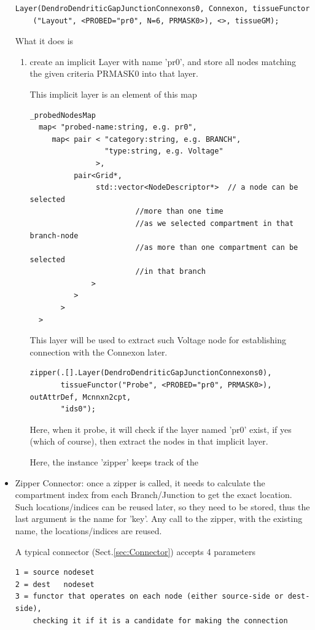\begin{itemize}
\begin{verbatim}
Layer(DendroDendriticGapJunctionConnexons0, Connexon, tissueFunctor
    ("Layout", <PROBED="pr0", N=6, PRMASK0>), <>, tissueGM);
\end{verbatim}
What it does is
\begin{enumerate}
  \item create an implicit Layer with name 'pr0', and store all nodes matching
  the given criteria PRMASK0 into that layer.

This implicit layer is an element of this map
\begin{verbatim}
_probedNodesMap
  map< "probed-name:string, e.g. pr0",
     map< pair < "category:string, e.g. BRANCH",
                 "type:string, e.g. Voltage"
               >,
          pair<Grid*,
               std::vector<NodeDescriptor*>  // a node can be selected 
                        //more than one time
                        //as we selected compartment in that branch-node
                        //as more than one compartment can be selected
                        //in that branch 
              >
          >
       >
  >
\end{verbatim}  

This layer will be used to extract such Voltage node for establishing
connection with the Connexon later.
\begin{verbatim}
zipper(.[].Layer(DendroDendriticGapJunctionConnexons0), 
       tissueFunctor("Probe", <PROBED="pr0", PRMASK0>), outAttrDef, Mcnnxn2cpt,
       "ids0");
\end{verbatim}
Here, when it probe, it will check if the layer named 'pr0' exist, if yes
(which of course), then extract the nodes in that implicit layer. 

Here, the instance 'zipper' keeps track of the 
\end{enumerate}
  
  \item Zipper Connector: once a zipper is called, it needs to calculate the
  compartment index from each Branch/Junction to get the exact location. 
  Such locations/indices can be reused later, so they need to be stored, thus
  the last argument is the name for 'key'. Any call to the zipper, with the
  existing name, the locations/indices are reused.

A typical connector (Sect.\ref{sec:Connector}) accepts 4 parameters
\begin{verbatim}
1 = source nodeset
2 = dest   nodeset
3 = functor that operates on each node (either source-side or dest-side),
    checking it if it is a candidate for making the connection


\end{verbatim}
\end{itemize}
